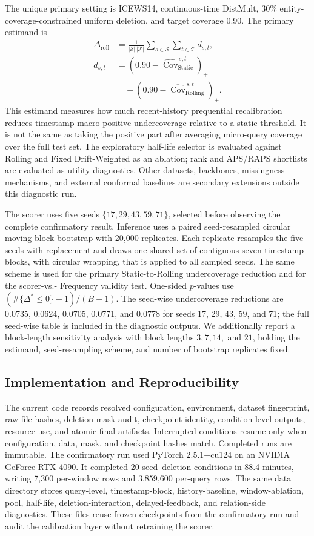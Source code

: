\documentclass[information,article,submit,oneauthor,pdftex]{Definitions/mdpi}
\newcommand{\cov}{\operatorname{Cov}}
\begin{document}
The unique primary setting is ICEWS14, continuous-time DistMult, 30\%
entity-coverage-constrained uniform deletion, and target coverage 0.90. The
primary estimand is
\[
\begin{aligned}
  \Delta_{\mathrm{roll}}
  &=\frac{1}{|\mathcal{S}|\,|\mathcal{T}|}
    \sum_{s\in\mathcal{S}}\sum_{t\in\mathcal{T}} d_{s,t},\\
  d_{s,t}
  &=(0.90-\widehat{\cov}^{\,s,t}_{\mathrm{Static}})_+\\
  &\quad -(0.90-\widehat{\cov}^{\,s,t}_{\mathrm{Rolling}})_+ .
\end{aligned}
\]
This estimand measures how much recent-history prequential recalibration reduces
timestamp-macro positive undercoverage relative to a static threshold. It is not
the same as taking the positive part after averaging micro-query coverage over
the full test set. The exploratory half-life selector is evaluated against
Rolling and Fixed Drift-Weighted as an ablation; rank and APS/RAPS shortlists
are evaluated as utility diagnostics. Other datasets, backbones, missingness
mechanisms, and external conformal baselines are secondary extensions outside
this diagnostic run.

The scorer uses five seeds
\(\{17,29,43,59,71\}\), selected before observing the complete confirmatory
result. Inference uses a paired seed-resampled circular moving-block bootstrap
with 20,000 replicates. Each replicate resamples the five seeds with replacement
and draws one shared set of contiguous seven-timestamp blocks, with circular
wrapping, that is applied to all sampled seeds. The same scheme is used for the
primary Static-to-Rolling undercoverage reduction and for the scorer-vs.-
Frequency validity test. One-sided \(p\)-values use
\((\#\{\Delta^\ast\leq 0\}+1)/(B+1)\).
The seed-wise undercoverage reductions are 0.0735, 0.0624, 0.0705, 0.0771,
and 0.0778 for seeds 17, 29, 43, 59, and 71; the full seed-wise table is
included in the diagnostic outputs.
We additionally report a block-length sensitivity analysis with block lengths
\(3,7,14,\) and \(21\), holding the estimand, seed-resampling scheme, and
number of bootstrap replicates fixed.

\subsection{Implementation and Reproducibility}

The current code records resolved configuration, environment, dataset
fingerprint, raw-file hashes, deletion-mask audit, checkpoint identity,
condition-level outputs, resource use, and atomic final artifacts. Interrupted
conditions resume only when configuration, data, mask, and checkpoint hashes
match. Completed runs are immutable.
The confirmatory run used PyTorch 2.5.1+cu124 on an NVIDIA GeForce RTX 4090.
It completed 20 seed--deletion conditions in 88.4 minutes, writing 7,300
per-window rows and 3,859,600 per-query rows.
The same data directory stores query-level, timestamp-block, history-baseline,
window-ablation, pool, half-life, deletion-interaction, delayed-feedback, and
relation-side diagnostics. These files reuse frozen checkpoints from the
confirmatory run and audit the calibration layer without retraining the
scorer.
\end{document}
